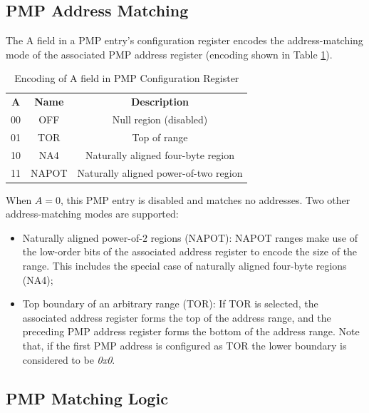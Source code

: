 \subsection{PMP Address Matching}
\label{subsec:pmpaddressmatching}

The A field in a PMP entry's configuration register encodes the address-matching
mode of the associated PMP address register (encoding shown in Table
\ref{tab:addressmatching}).

\begin{table}
  \centering
  \begin{tabular}{|c|c|c|}
    \hline
    \textbf{A}       & \textbf{Name} & \textbf{Description}                  \\
    \hhline {===} 00 & OFF           & Null region (disabled)                \\
    \hline
    01               & TOR           & Top of range                          \\
    \hline
    10               & NA4           & Naturally aligned four-byte region    \\
    \hline
    11               & NAPOT         & Naturally aligned power-of-two region \\
    \hline
  \end{tabular}
  \caption{Encoding of A field in PMP Configuration Register}
  \label{tab:addressmatching}
\end{table}

When $A=0$, this PMP entry is disabled and matches no addresses. Two other
address-matching modes are supported:
\begin{itemize}
  \item Naturally aligned power-of-$2$ regions (NAPOT): NAPOT ranges make use of
    the low-order bits of the associated address register to encode the size of
    the range. This includes the special case of naturally aligned four-byte regions
    (NA4);

  \item Top boundary of an arbitrary range (TOR): If TOR is selected, the associated
    address register forms the top of the address range, and the preceding PMP
    address register forms the bottom of the address range. Note that, if the
    first PMP address is configured as TOR the lower boundary is considered to
    be \textit{0x0}.
\end{itemize}

\subsection{PMP Matching Logic}
\label{subsec:matchinglogic}


